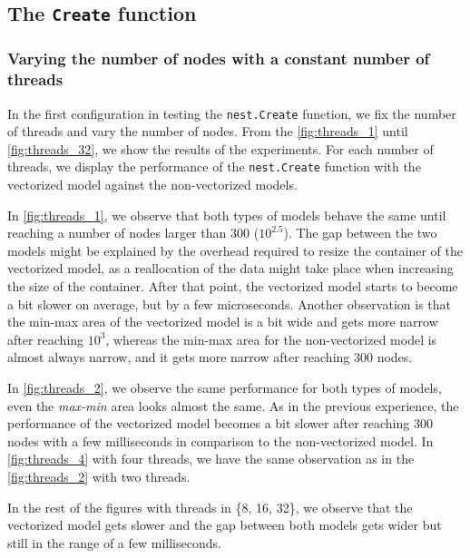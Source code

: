 \subsection{The \texttt{Create} function}

\subsubsection*{Varying the number of nodes with a constant number of threads}

 In the first configuration in testing the \texttt{nest.Create} function, we fix the number of threads and vary the number of nodes. From the  \autoref{fig:threads_1} until \autoref{fig:threads_32}, we show the results of the experiments. For each number of threads, we display the performance of the \texttt{nest.Create} function with the vectorized model against the non-vectorized models. 


In \autoref{fig:threads_1}, we observe that both types of models behave the same until reaching a number of nodes larger than 300 ($10^{2.5}$). The gap between the two models might be explained by the overhead required to resize the container of the vectorized model, as a reallocation of the data might take place when increasing the size of the container. After that point, the vectorized model starts to become a bit slower on average, but by a few microseconds. Another observation is that the min-max area of the vectorized model is a bit wide and gets more narrow after reaching $10^3$, whereas the min-max area for the non-vectorized model is almost always narrow, and it gets more narrow after reaching 300 nodes.

In \autoref{fig:threads_2}, we observe the same performance for both types of models, even the \emph{max-min} area looks almost the same. As in the previous experience, the performance of the vectorized model becomes a bit slower after reaching 300 nodes with a few milliseconds in comparison to the non-vectorized model. In \autoref{fig:threads_4} with four threads, we have the same observation as in the \autoref{fig:threads_2} with two threads.

In the rest of the figures with threads in \{8, 16, 32\}, we observe that the vectorized model gets slower and the gap between both models gets wider but still in the range of a few milliseconds.

